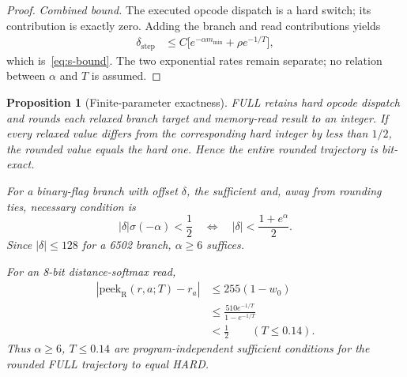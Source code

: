 \documentclass[letterpaper]{article} %
\newtheorem{proposition}{Proposition}
\begin{document}
\begin{proof}
\textit{Combined bound.}
The executed opcode dispatch is a hard switch;
its contribution is exactly zero. Adding the
branch and read contributions yields
\begin{equation}
\begin{aligned}
\delta_{\mathrm{step}}
&\le C\big[
e^{-\alpha m_{\min}}
+\rho e^{-1/T}\big],
\end{aligned}
\label{eq:s-perstep}
\end{equation}
which is~\eqref{eq:s-bound}. The two
exponential rates remain separate; no relation
between $\alpha$ and $T$ is assumed.
\end{proof}

\begin{proposition}[Finite-parameter exactness]
\label{prop:s-finite}
FULL retains hard opcode dispatch and rounds
each relaxed branch target and memory-read result
to an integer. If every relaxed value differs
from the corresponding hard integer by less
than $1/2$, the rounded value equals the hard
one. Hence the entire rounded trajectory is
bit-exact.

For a binary-flag branch with offset $\delta$,
the sufficient and, away from rounding ties,
necessary condition is
\begin{equation}
|\delta|\sigma(-\alpha)<\frac12
\quad\Longleftrightarrow\quad
|\delta|<\frac{1+e^\alpha}{2}.
\label{eq:s-branchcorner}
\end{equation}
Since $|\delta|\le128$ for a 6502 branch,
$\alpha\ge6$ suffices.

For an 8-bit distance-softmax read,
\begin{equation}
\begin{aligned}
|\mathrm{peek}_{\mathrm{R}}(r,a;T)-r_a|
&\le255(1-w_0)\\
&\le\frac{510e^{-1/T}}{1-e^{-1/T}}\\
&<\frac12 \qquad(T\le0.14).
\end{aligned}
\label{eq:s-readcorner}
\end{equation}
Thus $\alpha\ge6$, $T\le0.14$ are
program-independent sufficient conditions
for the rounded FULL trajectory to equal HARD.
\end{proposition}
\end{document}
